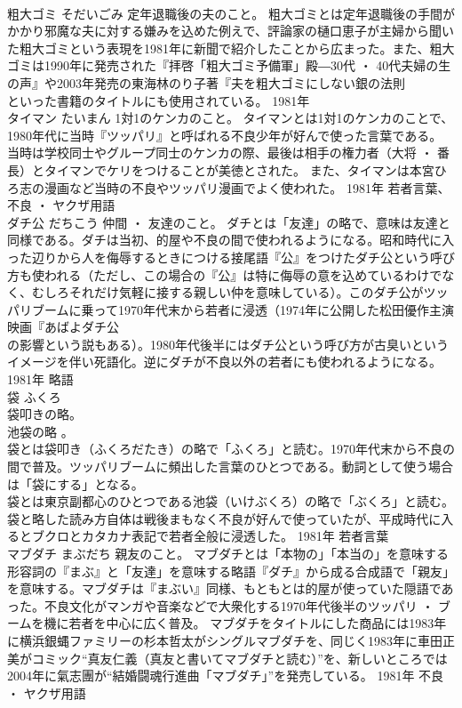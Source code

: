 \documentclass[8pt]{extreport}
\begin{document}
\begin{CJK}{UTF8}{min}
\\	粗大ゴミ	そだいごみ	定年退職後の夫のこと。	粗大ゴミとは定年退職後の手間がかかり邪魔な夫に対する嫌みを込めた例えで、評論家の樋口恵子が主婦から聞いた粗大ゴミという表現を1981年に新聞で紹介したことから広まった。また、粗大ゴミは1990年に発売された『拝啓「粗大ゴミ予備軍」殿―30代 ・ 40代夫婦の生の声』や2003年発売の東海林のり子著『夫を粗大ゴミにしない銀の法則 
\\	といった書籍のタイトルにも使用されている。	1981年	
\\	タイマン	たいまん	1対1のケンカのこと。	タイマンとは1対1のケンカのことで、1980年代に当時『ツッパリ』と呼ばれる不良少年が好んで使った言葉である。 当時は学校同士やグループ同士のケンカの際、最後は相手の権力者（大将 ・ 番長）とタイマンでケリをつけることが美徳とされた。 また、タイマンは本宮ひろ志の漫画など当時の不良やツッパリ漫画でよく使われた。	1981年	若者言葉、不良 ・ ヤクザ用語	
\\	ダチ公	だちこう	仲間 ・ 友達のこと。	ダチとは「友達」の略で、意味は友達と同様である。ダチは当初、的屋や不良の間で使われるようになる。昭和時代に入った辺りから人を侮辱するときにつける接尾語『公』をつけたダチ公という呼び方も使われる（ただし、この場合の『公』は特に侮辱の意を込めているわけでなく、むしろそれだけ気軽に接する親しい仲を意味している）。このダチ公がツッパリブームに乗って1970年代末から若者に浸透（1974年に公開した松田優作主演映画『あばよダチ公 
\\	の影響という説もある）。1980年代後半にはダチ公という呼び方が古臭いというイメージを伴い死語化。逆にダチが不良以外の若者にも使われるようになる。	1981年	略語	
\\	袋	ふくろ	
\\	袋叩きの略。 
\\	池袋の略 。	
\\	袋とは袋叩き（ふくろだたき）の略で「ふくろ」と読む。1970年代末から不良の間で普及。ツッパリブームに頻出した言葉のひとつである。動詞として使う場合は「袋にする」となる。 
\\	袋とは東京副都心のひとつである池袋（いけぶくろ）の略で「ぶくろ」と読む。袋と略した読み方自体は戦後まもなく不良が好んで使っていたが、平成時代に入るとブクロとカタカナ表記で若者全般に浸透した。	1981年	若者言葉	
\\	マブダチ	まぶだち	親友のこと。	マブダチとは「本物の」「本当の」を意味する形容詞の『まぶ』と「友達」を意味する略語『ダチ』から成る合成語で「親友」を意味する。マブダチは『まぶい』同様、もともとは的屋が使っていた隠語であった。不良文化がマンガや音楽などで大衆化する1970年代後半のツッパリ ・ ブームを機に若者を中心に広く普及。 マブダチをタイトルにした商品には1983年に横浜銀蝿ファミリーの杉本哲太がシングルマブダチを、同じく1983年に車田正美がコミック“真友仁義（真友と書いてマブダチと読む）”を、新しいところでは2004年に氣志團が“結婚闘魂行進曲「マブダチ」”を発売している。	1981年	不良 ・ ヤクザ用語	

\end{CJK}
\end{document}
